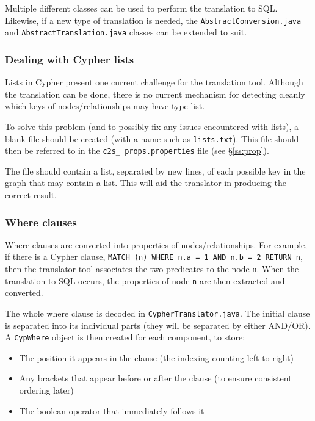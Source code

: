 \documentclass[letterpaper]{ltxdoc}
\begin{document}
Multiple different classes can be used to perform the translation to SQL. Likewise, if a new type of translation is needed, the \texttt{AbstractConversion.java} and \texttt{AbstractTranslation.java} classes can be extended to suit.

\subsubsection{Dealing with Cypher lists}
\label{sssec:lists}
Lists in Cypher present one current challenge for the translation tool. Although the translation can be done, there is no current mechanism for detecting cleanly which keys of nodes/relationships may have type list.

To solve this problem (and to possibly fix any issues encountered with lists), a blank file should be created (with a name such as \texttt{lists.txt}). This file should then be referred to in the \texttt{c2s\_ props.properties} file (see \S \ref{ss:prop}).

The file should contain a list, separated by new lines, of each possible key in the graph that may contain a list. This will aid the translator in producing the correct result.


\subsubsection{Where clauses}
Where clauses are converted into properties of nodes/relationships. For example, if there is a Cypher clause, \texttt{MATCH (n) WHERE n.a = 1 AND n.b = 2 RETURN n}, then the translator tool associates the two predicates to the node \texttt{n}. When the translation to SQL occurs, the properties of node \texttt{n} are then extracted and converted.

The whole where clause is decoded in \texttt{CypherTranslator.java}. The initial clause is separated into its individual parts (they will be separated by either AND/OR). A \texttt{CypWhere} object is then created for each component, to store:

\begin{itemize}
\item The position it appears in the clause (the indexing counting left to right)
\item Any brackets that appear before or after the clause (to ensure consistent ordering later)
\item The boolean operator that immediately follows it
\end{itemize}
\end{document}
